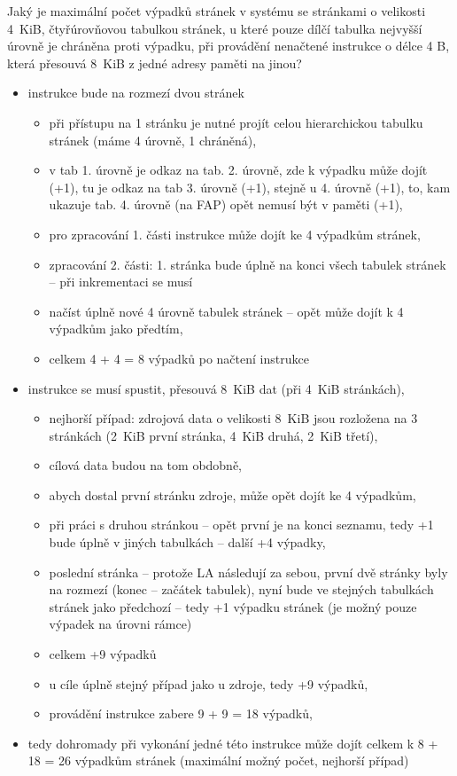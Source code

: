 \documentclass[a4paper, 11pt]{article}
\begin{document}
Jaký je maximální počet výpadků stránek v systému se stránkami o velikosti 4~KiB, čtyřúrovňovou tabulkou stránek, u které pouze dílčí tabulka nejvyšší úrovně je chráněna proti výpadku, při provádění nenačtené instrukce o délce 4 B, která přesouvá 8~KiB z jedné adresy paměti na jinou?
\begin{itemize}
    \item instrukce bude na rozmezí dvou stránek
    \begin{itemize}
    \item při přístupu na 1 stránku je nutné projít celou hierarchickou tabulku stránek (máme 4 úrovně, 1 chráněná),
    \item v tab 1. úrovně je odkaz na tab. 2. úrovně, zde k výpadku může dojít (+1), tu je odkaz na tab 3. úrovně (+1), stejně u 4. úrovně (+1), to, kam ukazuje tab. 4. úrovně (na FAP) opět nemusí být v paměti (+1),
    \item pro zpracování 1. části instrukce může dojít ke 4 výpadkům stránek,
    \item zpracování 2. části: 1. stránka bude úplně na konci všech tabulek stránek -- při inkrementaci se musí
    \item načíst úplně nové 4 úrovně tabulek stránek -- opět může dojít k 4 výpadkům jako předtím,
    \item celkem 4 + 4 = 8 výpadků po načtení instrukce
    \end{itemize}
    \item instrukce se musí spustit, přesouvá 8~KiB dat (při 4~KiB stránkách), 
    \begin{itemize}
        \item nejhorší případ: zdrojová data o velikosti 8~KiB jsou rozložena na 3 stránkách (2~KiB první stránka, 4~KiB druhá, 2~KiB třetí),
    \item cílová data budou na tom obdobně,
    \item abych dostal první stránku zdroje, může opět dojít ke 4 výpadkům,
    \item při práci s druhou stránkou -- opět první je na konci seznamu, tedy +1 bude úplně v jiných tabulkách -- další +4 výpadky,
    \item poslední stránka -- protože LA následují za sebou, první dvě stránky byly na rozmezí (konec -- začátek tabulek), nyní bude ve stejných tabulkách stránek jako předchozí -- tedy +1 výpadku stránek (je možný pouze výpadek na úrovni rámce)
    \item celkem +9 výpadků
    \item u cíle úplně stejný případ jako u zdroje, tedy +9 výpadků,
    \item provádění instrukce zabere 9 + 9 = 18 výpadků,
    \end{itemize}
    
    \item tedy dohromady při vykonání jedné této instrukce může dojít celkem k 8 + 18 = 26 výpadkům stránek (maximální možný počet, nejhorší případ)
\end{itemize}
\end{document}
